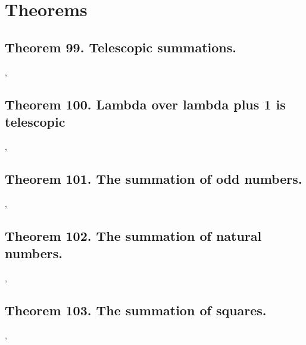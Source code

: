 \documentclass[preview]{standalone}
\begin{document}
\section{Theorems}


\subsection[Telescopic summations.]{
    \color{section} Theorem 99. \color{black} Telescopic summations.
    }

\sep
\pagebreak


\subsection[Lambda divided by lambda plus one is telescopic.]{
    \color{section} Theorem 100. \color{black} Lambda over lambda plus 1 is telescopic
}
\vspace{-0.8cm}

\sep
\pagebreak


\subsection[The summation of odd numbers is a square.]{
    \color{section} Theorem 101. \color{black} The summation of odd numbers.
}

\sep
\pagebreak

\subsection[The summation of natural numbers.]{
    \color{section} Theorem 102. \color{black} The summation of natural numbers.
}

\sep
\pagebreak


\subsection[The summation of squares.]{
    \color{section} Theorem 103. \color{black} The summation of squares.
}

\sep
\pagebreak
\end{document}
